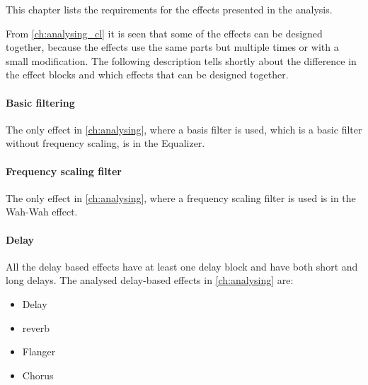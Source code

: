This chapter lists the requirements for the effects presented in the analysis. 


From \autoref{ch:analysing_cl} it is seen that some of the effects can be designed together, because the effects use the same parts but multiple times or with a small modification. The following description tells shortly about the difference in the effect blocks and which effects that can be designed together.

\paragraph*{Basic filtering}
The only effect in \autoref{ch:analysing}, where a basis filter is used, which is a basic filter without frequency scaling, is in the Equalizer.

\paragraph{Frequency scaling filter}
The only effect in \autoref{ch:analysing}, where a frequency scaling filter is used is in the Wah-Wah effect.

\paragraph{Delay}
All the delay based effects have at least one delay block and have both short and long delays. The analysed delay-based effects in \autoref{ch:analysing} are:
\begin{itemize}
	\item Delay
	\item \gls{reverb}
	\item Flanger
	\item Chorus
\end{itemize} 

